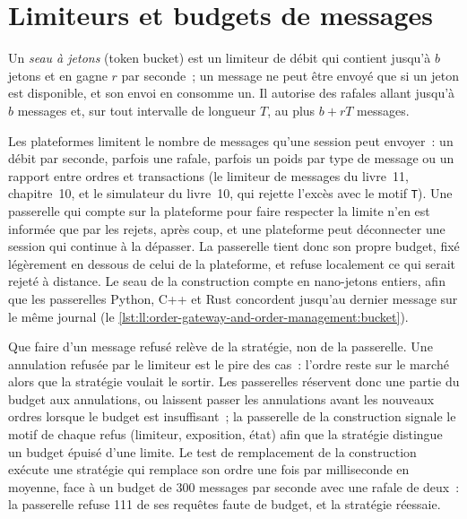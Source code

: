 \section{Limiteurs et budgets de messages}

\begin{definition}\label{def:ll:order-gateway-and-order-management:bucket}
Un \emph{seau à jetons} (token bucket) est un limiteur de débit qui contient jusqu'à $b$ jetons et en gagne $r$ par seconde~; un
message ne peut être envoyé que si un jeton est disponible, et son envoi en consomme un. Il autorise des rafales allant jusqu'à $b$ messages et, sur
tout intervalle de longueur $T$, au plus $b + rT$ messages.
\end{definition}

Les plateformes limitent le nombre de messages qu'une session peut envoyer~: un débit par seconde, parfois une rafale, parfois un poids par type de message
ou un rapport entre ordres et transactions (le limiteur de messages du livre~11, chapitre~10, et le simulateur du livre~10, qui rejette
l'excès avec le motif \texttt{T}). Une passerelle qui compte sur la plateforme pour faire respecter la limite n'en est informée que par les rejets,
après coup, et une plateforme peut déconnecter une session qui continue à la dépasser. La passerelle tient donc son propre budget, fixé
légèrement en dessous de celui de la plateforme, et refuse localement ce qui serait rejeté à distance. Le seau de la construction compte en
nano-jetons entiers, afin que les passerelles Python, C++ et Rust concordent jusqu'au dernier message sur le même journal
(le \cref{lst:ll:order-gateway-and-order-management:bucket}).

\label{lst:ll:order-gateway-and-order-management:bucket}

Que faire d'un message refusé relève de la stratégie, non de la passerelle. Une annulation refusée par le limiteur est le pire
des cas~: l'ordre reste sur le marché alors que la stratégie voulait le sortir. Les passerelles réservent donc une partie du budget aux annulations,
ou laissent passer les annulations avant les nouveaux ordres lorsque le budget est insuffisant~; la passerelle de la construction signale le motif de chaque refus
(limiteur, exposition, état) afin que la stratégie distingue un budget épuisé d'une limite. Le test de remplacement de la construction exécute une
stratégie qui remplace son ordre une fois par milliseconde en moyenne, face à un budget de 300 messages par seconde avec une rafale de deux~:
la passerelle refuse 111 de ses requêtes faute de budget, et la stratégie réessaie.

